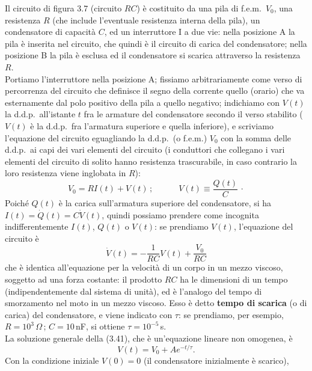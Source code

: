 Il circuito di figura 3.7 (circuito $RC$) \`e costituito da una pila di
f.e.m.\ $V_0$, una resistenza $R$ (che include l'eventuale resistenza interna
della pila), un condensatore di capacit\`a $C$, ed un interruttore I a due vie:
nella posizione A la pila \`e inserita nel circuito, che quindi \`e il circuito
di carica del condensatore; nella posizione B la pila \`e esclusa ed il
condensatore si scarica attraverso la resistenza $R$.\\
Portiamo l'interruttore nella posizione A; fissiamo arbitrariamente come verso
di percorrenza del circuito che definisce il segno della corrente quello
(orario) che va esternamente dal polo positivo della pila a quello negativo;
indichiamo con $V(t)$ la d.d.p.\ all'istante $t$ fra le armature del
condensatore secondo il verso stabilito ($V(t)$ \`e la d.d.p.\ fra l'armatura
superiore e quella inferiore), e scriviamo l'equazione del circuito eguagliando
la d.d.p.\ (o f.e.m.) $V_0$ con la somma delle d.d.p.\ ai capi dei vari elementi
del circuito (i conduttori che collegano i vari elementi del circuito di solito
hanno resistenza trascurabile, in caso contrario la loro resistenza viene
inglobata in $R$):
\begin{equation}
  V_0=RI(t)+V(t)\,;\qquad\quad V(t)\equiv\frac{Q(t)}{C}\,\cdot
  \tag{3.40}
\end{equation}
Poich\'e $Q(t)$ \`e la carica sull'armatura superiore del condensatore, si ha
$I(t)=\dot Q(t)=C\dot V(t)$, quindi possiamo prendere come incognita
indifferentemente $I(t)$, $Q(t)$ o $V(t)$: se prendiamo $V(t)$, l'equazione del
circuito \`e
\begin{equation}
  \dot V(t)=-\frac{1}{RC}V(t)+\frac{V_0}{RC}
  \tag{3.41}
\end{equation}
che \`e identica all'equazione per la velocit\`a di un corpo in un mezzo
viscoso, soggetto ad una forza costante: il prodotto $RC$ ha le dimensioni di un
tempo (indipendentemente dal sistema di unit\`a), ed \`e l'analogo del tempo di
smorzamento nel moto in un mezzo viscoso. Esso \`e detto \textbf{tempo di
scarica} (o di carica) del condensatore, e viene indicato con $\tau$: se
prendiamo, per esempio, $R=10^3\,\Omega$\,; $C=10$\,nF, si ottiene
$\tau=10^{-5}$\,s.\\
La soluzione generale della (3.41), che \`e un'equazione lineare non omogenea,
\`e
\begin{equation}
  V(t)=V_0+Ae^{-t/\tau}.
  \tag{3.42}
\end{equation}
Con la condizione iniziale $V(0)=0$ (il condensatore inizialmente \`e scarico),
